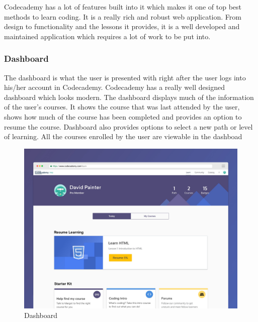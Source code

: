 Codecademy has a lot of features built into it which makes it one of top best methods to learn coding. It is a really rich and robust web application. From design to functionality and the lessons it provides, it is a well developed and maintained application which requires a lot of work to be put into.



\subsubsection {Dashboard}
The dashboard is what the user is presented with right after the user logs into his/her account in Codecademy. Codecademy has a really well designed dashboard which looks modern. The dashboard displays much of the information of the user's courses. It shows the course that was last attended by the user, shows how much of the course has been completed and provides an option to resume the course. Dashboard also provides options to select a new path or level of learning. All the courses enrolled by the user are viewable in the dashboad\\

\begin{figure}[h]
	\label{ss}    %
	\centering
	\includegraphics[width= 15 cm,height=10 cm]{dashboard.jpg}
	\caption{Dashboard}
\end{figure}


